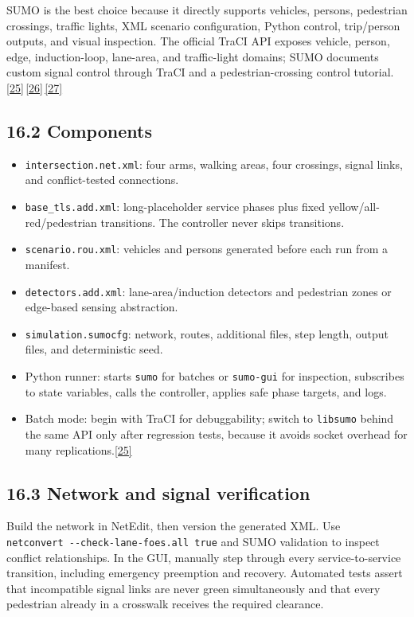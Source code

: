 \documentclass[
  english,
  11pt,
  a4paper,
]{article}
\providecommand{\tightlist}{%
  \setlength{\itemsep}{0pt}\setlength{\parskip}{0pt}}
\begin{document}
SUMO is the best choice because it directly supports vehicles, persons,
pedestrian crossings, traffic lights, XML scenario configuration, Python
control, trip/person outputs, and visual inspection. The official TraCI
API exposes vehicle, person, edge, induction-loop, lane-area, and
traffic-light domains; SUMO documents custom signal control through
TraCI and a pedestrian-crossing control
tutorial.\hyperref[source-25]{[25]}\,\hyperref[source-26]{[26]}\,\hyperref[source-27]{[27]}

\subsection{16.2 Components}\label{components}

\begin{itemize}
\tightlist
\item
  \texttt{intersection.net.xml}: four arms, walking areas, four
  crossings, signal links, and conflict-tested connections.
\item
  \texttt{base\_tls.add.xml}: long-placeholder service phases plus fixed
  yellow/all-red/pedestrian transitions. The controller never skips
  transitions.
\item
  \texttt{scenario.rou.xml}: vehicles and persons generated before each
  run from a manifest.
\item
  \texttt{detectors.add.xml}: lane-area/induction detectors and
  pedestrian zones or edge-based sensing abstraction.
\item
  \texttt{simulation.sumocfg}: network, routes, additional files, step
  length, output files, and deterministic seed.
\item
  Python runner: starts \texttt{sumo} for batches or \texttt{sumo-gui}
  for inspection, subscribes to state variables, calls the controller,
  applies safe phase targets, and logs.
\item
  Batch mode: begin with TraCI for debuggability; switch to
  \texttt{libsumo} behind the same API only after regression tests,
  because it avoids socket overhead for many
  replications.\hyperref[source-25]{[25]}
\end{itemize}

\subsection{16.3 Network and signal
verification}\label{network-and-signal-verification}

Build the network in NetEdit, then version the generated XML. Use
\texttt{netconvert\ -\/-check-lane-foes.all\ true} and SUMO validation
to inspect conflict relationships. In the GUI, manually step through
every service-to-service transition, including emergency preemption and
recovery. Automated tests assert that incompatible signal links are
never green simultaneously and that every pedestrian already in a
crosswalk receives the required clearance.
\end{document}

